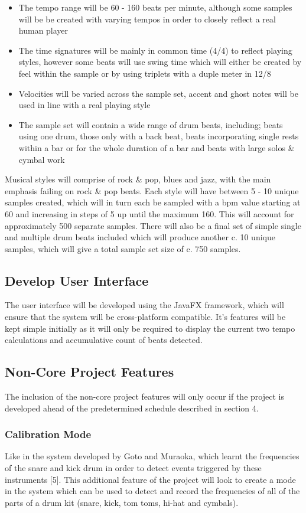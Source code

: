 \documentclass[a4paper, 11pt]{article}
\begin{document}
\begin{itemize}
\item The tempo range will be 60 - 160 beats per minute, although some samples will be be created with varying tempos in order to closely reflect a real human player
\item The time signatures will be mainly in common time (4/4) to reflect playing styles, however some beats will use swing time which will either be created by feel within the sample or by using triplets with a duple meter in 12/8
\item Velocities will be varied across the sample set, accent and ghost notes will be used in line with a real playing style
\item The sample set will contain a wide range of drum beats, including; beats using one drum, those only with a back beat, beats incorporating single rests within a bar or for the whole duration of a bar and beats with large solos \& cymbal work
\end{itemize} 

Musical styles will comprise of rock \& pop, blues and jazz, with the main emphasis failing on rock \& pop beats. Each style will have between 5 - 10 unique samples created, which will in turn each be sampled with a bpm value starting at 60 and increasing in steps of 5 up until the maximum 160. This will account for approximately 500 separate samples. There will also be a final set of simple single and multiple drum beats included which will produce another c. 10 unique samples, which will give a total sample set size of c. 750 samples.

\subsection{Develop User Interface}
The user interface will be developed using the JavaFX framework, which will ensure that the system will be cross-platform compatible. It's features will be kept simple initially as it will only be required to display the current two tempo calculations and accumulative count of beats detected.

\subsection{Non-Core Project Features}
The inclusion of the non-core project features will only occur if the project is developed ahead of the predetermined schedule described in section 4. 

\subsubsection{Calibration Mode}
Like in the system developed by Goto and Muraoka, which learnt the frequencies of the snare and kick drum in order to detect events triggered by these instruments [5]. This additional feature of the project will look to create a mode in the system which can be used to detect and record the frequencies of all of the parts of a drum kit (snare, kick, tom toms, hi-hat and cymbals).
\end{document}

